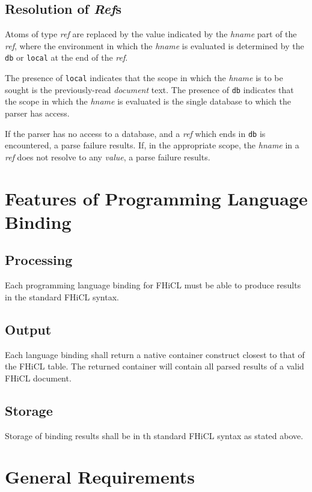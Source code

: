 \documentclass{memarticle}
\begin{document}
	\subsection{Resolution of \emph{Ref}s\label{sec:refs}}
		Atoms of type \emph{ref} are replaced
		by the value indicated by the \emph{hname} part of the \emph{ref},
		where the environment in which the \emph{hname} is evaluated is determined
		by the \texttt{db} or \texttt{local} at the end of the \emph{ref}.
		\vspace{1mm}
		\par
		The presence of \texttt{local} indicates 
		that the scope in which the \emph{hname} is to be sought
		is the previously-read \emph{document} text.
		The presence of 
		\texttt{db} indicates
		that the scope in which the \emph{hname} is evaluated
		is the single database
		to which the parser has access.
		\vspace{1mm}
		\par
		If the parser has no access to a database,
		and a \emph{ref} which ends in \texttt{db} is encountered,
		a parse failure results.
		If,
		in the appropriate scope,
		the \emph{hname} in a \emph{ref} does not resolve to any \emph{value},
		a parse failure results.
		
\section{Features of Programming Language Binding}
	\subsection{Processing}
		Each programming language binding for FHiCL must be able to produce results
		in the standard FHiCL syntax. 
	
	\subsection{Output}
		Each language binding shall return a native container construct closest to that of the FHiCL table.
		The returned container will contain all parsed results of a valid FHiCL document.

	\subsection{Storage}	
		Storage of binding results shall be in th standard FHiCL syntax as stated above.
		
\section{General Requirements}
\end{document}
